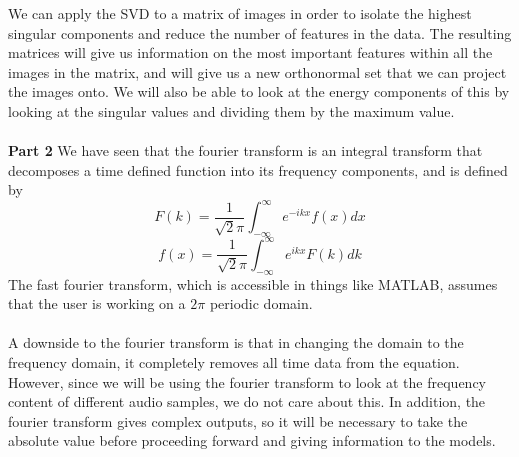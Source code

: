 \documentclass{article}
\begin{document}
	We can apply the SVD to a matrix of images in order to isolate the highest singular components and reduce the number of features in the data. The resulting matrices will give us information on the most important features within all the images in the matrix, and will give us a new orthonormal set that we can project the images onto. We will also be able to look at the energy components of this by looking at the singular values and dividing them by the maximum value.\\ \\
\textbf{Part 2}
We have seen that the fourier transform is an integral transform that decomposes a time defined function into its frequency components, and is defined by
	\begin{equation} \label{eq:2a}
		F(k) = \frac{1}{\sqrt2\pi} \int_{-\infty}^{\infty} e^{-ikx} f(x) dx
	\end{equation}
		\begin{equation} \label{eq:2b}
		f(x) = \frac{1}{\sqrt2\pi} \int_{-\infty}^{\infty} e^{ikx} F(k) dk
	\end{equation}
	The fast fourier transform, which is accessible in things like MATLAB, assumes that the user is working on a $2\pi$ periodic domain. \\ \\
A downside to the fourier transform is that in changing the domain to the frequency domain, it completely removes all time data from the equation. However, since we will be using the fourier transform to look at the frequency content of different audio samples, we do not care about this. In addition, the fourier transform gives complex outputs, so it will be necessary to take the absolute value before proceeding forward and giving information to the models. \\ \\
\end{document}
